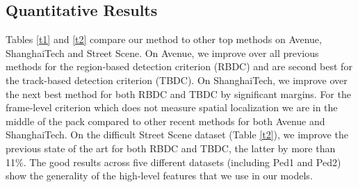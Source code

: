 \subsection{Quantitative Results}
Tables \ref{t1} and \ref{t2} compare our method to other top methods on Avenue, ShanghaiTech and Street Scene.  On Avenue, we improve over all previous methods for the region-based detection criterion (RBDC) and are second best for the track-based detection criterion (TBDC).  On ShanghaiTech, we improve over the next best method for both RBDC and TBDC by significant margins.  For the frame-level criterion which does not measure spatial localization we are in the middle of the pack compared to other recent methods for both Avenue and ShanghaiTech. On the  difficult Street Scene dataset (Table \ref{t2}), we improve the previous state of the art for both RBDC and TBDC, the latter by more than 11\%.  The good results across five different datasets (including Ped1 and Ped2) show the generality of the high-level features that we use in our models.

